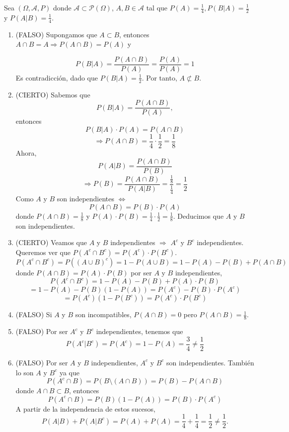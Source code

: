 \begin{sol}
  Sea $(\Omega, \mathcal{A}, P )$ donde $\mathcal{A} \subset \mathcal{P}(\Omega)$, $A, B \in \mathcal{A}$ tal que $P(A) = \frac{1}{4}, P(B | A) = \frac{1}{2}$ y $P(A | B) = \frac{1}{4}$.
  \begin{enumerate}[label=(\roman*)]
    \item (FALSO) Supongamos que $A \subset B$, entonces $A \cap B = A \Rightarrow P(A \cap B) = P(A)$ y

      \[
        P(B | A) = \frac{P(A \cap B)}{P(A)} = \frac{P(A)}{P(A)} = 1
      \]
      Es contradicción, dado que $P(B | A) = \frac{1}{2}$. Por tanto, $A \not \subset B$.

    \item (CIERTO) Sabemos que
      \[ 
        P(B | A) = \frac{P(A \cap B)}{ P(A)},
      \] 
      entonces
      \[ 
        P(B | A) \cdot P(A) = P(A \cap B) 
      \] 
      \[ 
        \Rightarrow P(A \cap B) = \frac{1}{4} \cdot \frac{1}{2} = \frac{1}{8} 
      \]  
      Ahora,
      \[ 
        P(A | B) = \frac{P(A \cap B)}{P(B)}
      \] 
      \[ 
        \Rightarrow P(B) = \frac{P(A \cap B)}{P(A | B)} = \frac{\frac{1}{8}}{\frac{1}{4}} = \frac{1}{2} 
      \] 
      Como $A$ y $B$ son independientes $\Leftrightarrow$
      \[ 
        P(A \cap B) = P(B) \cdot P(A) 
      \] 
      donde $P(A \cap B) = \frac{1}{8}$ y $P(A) \cdot P(B) = \frac{1}{4} \cdot \frac{1}{2} = \frac{1}{8}$. Deducimos que $A$ y $B$ son independientes.

    \item (CIERTO) Veamos que $A$ y $B$ independientes $\Rightarrow$ $A^{c}$ y $B^{c}$ independientes. Queremos ver que $P(A^{c} \cap B^{c}) = P(A^{c})\cdot P(B^{c})$.
      \[ 
        P(A^{c} \cap B^{c}) = P((A \cup B)^{c}) = 1 - P(A \cup B) = 1 - P(A) - P(B) + P(A \cap B)
      \] 
      donde $P(A \cap B) = P(A) \cdot P(B)$ por ser $A$ y $ B$ independientes,
      \[ 
        P(A^{c} \cap B^{c}) = 1 - P(A) - P(B) + P(A)\cdot P(B)
      \] 
      \[ 
        = 1 - P(A) - P(B)(1 - P(A)) = P(A^{c}) - P(B) \cdot P(A^{c}) 
      \]
      \[ 
        = P(A^{c})(1 - P(B^{c})) = P(A^{c}) \cdot P(B^{c}) 
      \] 

    \item (FALSO) Si $A$ y $B$ son incompatibles, $P(A \cap B) = 0$ pero $P(A \cap B) = \frac{1}{8}$.
    \item (FALSO) Por ser $A^{c}$ y $B^{c}$ independientes, tenemos que
      \[
        P(A^{c} | B^{c}) = P(A^{c}) = 1 - P(A) = \frac{3}{4} \neq \frac{1}{2}
      \] 

    \item (FALSO) Por ser $A$ y $B$ independientes, $A^{c}$ y $B^{c}$ son independientes. También lo son $ A$ y $B^{c}$ ya que
      \[ 
        P(A^{c} \cap B) = P(B \setminus (A \cap B)) = P(B) - P(A \cap B)
      \] 
      donde $A \cap B \subset B$, entonces
      \[ 
        P(A^{c} \cap B) = P(B)(1 - P(A)) = P(B) \cdot P(A^{c}) 
      \] 
      A partir de la independencia de estos sucesos,
      \[ 
        P(A | B) + P(A | B^{c}) = P(A) + P(A) = \frac{1}{4} + \frac{1}{4} = \frac{1}{2} \neq \frac{1}{2}.
      \] 
  \end{enumerate}
\end{sol}

